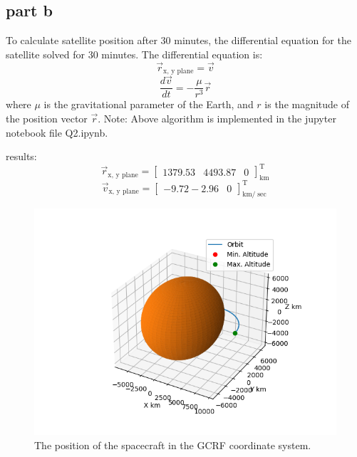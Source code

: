 \subsection{part b}
To calculate satellite position after 30 minutes, the differential equation for the satellite solved for 30 minutes. The differential equation is:
$$
\vec{r}_{\textrm{x, y plane}} = \vec{v}
$$
$$
\frac{d\vec{v}}{dt} = -\frac{\mu}{r^3}\vec{r}
$$
where $\mu$ is the gravitational parameter of the Earth, and $r$ is the magnitude of the position vector $\vec{r}$.
Note: Above algorithm is implemented in the jupyter notebook file Q2.ipynb.

results:
$$
\vec{r}_{\textrm{x, y plane}} = \begin{bmatrix}
    1379.53 & 4493.87 & 0
\end{bmatrix}_{\textrm{km}}^{\textrm{T}}
$$
$$
\vec{v}_{\textrm{x, y plane}} = \begin{bmatrix}
    -9.72 -2.96 & 0
    \end{bmatrix}_{\textrm{km}/\sec}^{\textrm{T}}
$$

\begin{figure}[H]
    \centering
    \includegraphics[width=\textwidth]{../Figure/Q2/satellite_orbit.png}
    \caption{The position of the spacecraft in the GCRF coordinate system.}
    \label{fig:fig1}
\end{figure}